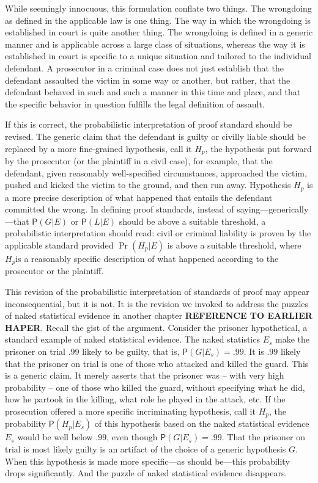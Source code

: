 \documentclass[
  10pt,
  dvipsnames,enabledeprecatedfontcommands]{scrartcl}
\newcommand{\pr}[1]{\mathsf{P}(#1)}
\begin{document}
While seemingly innocuous, this formulation conflate two things. The
wrongdoing as defined in the applicable law is one thing. The way in
which the wrongdoing is established in court is quite another thing. The
wrongdoing is defined in a generic manner and is applicable across a
large class of situations, whereas the way it is established in court is
specific to a unique situation and tailored to the individual defendant.
A prosecutor in a criminal case does not just establish that the
defendant assaulted the victim in some way or another, but rather, that
the defendant behaved in such and such a manner in this time and place,
and that the specific behavior in question fulfills the legal definition
of assault.

If this is correct, the probabilistic interpretation of proof standard
should be revised. The generic claim that the defendant is guilty or
civilly liable should be replaced by a more fine-grained hypothesis,
call it \(H_p\), the hypothesis put forward by the prosecutor (or the
plaintiff in a civil case), for example, that the defendant, given
reasonably well-specified circumstances, approached the victim, pushed
and kicked the victim to the ground, and then run away. Hypothesis
\(H_p\) is a more precise description of what happened that entails the
defendant committed the wrong. In defining proof standards, instead of
saying---generically---that \(\pr{G \vert E}\) or \(\pr{L \vert E}\)
should be above a suitable threshold, a probabilistic interpretation
should read: civil or criminal liability is proven by the applicable
standard provided \(\Pr(H_p \vert E)\) is above a suitable threshold,
where \(H_p\)is a reasonably specific description of what happened
according to the prosecutor or the plaintiff.

This revision of the probabilistic interpretation of standards of proof
may appear inconsequential, but it is not. It is the revision we invoked
to address the puzzles of naked statistical evidence in another chapter
\textbf{REFERENCE TO EARLIER HAPER}. Recall the gist of the argument.
Consider the prisoner hypothetical, a standard example of naked
statistical evidence. The naked statistics \(E_s\) make the prisoner on
trial .99 likely to be guilty, that is, \(\pr{G \vert E_s} =.99\). It is
\(.99\) likely that the prisoner on trial is one of those who attacked
and killed the guard. This is a generic claim. It merely asserts that
the prisoner was -- with very high probability -- one of those who
killed the guard, without specifying what he did, how he partook in the
killing, what role he played in the attack, etc. If the prosecution
offered a more specific incriminating hypothesis, call it \(H_p\), the
probability \(\pr{H_p \vert E_{s}}\) of this hypothesis based on the
naked statistical evidence \(E_s\) would be well below \(.99\), even
though \(\pr{G \vert E_s}=.99\). That the prisoner on trial is most
likely guilty is an artifact of the choice of a generic hypothesis
\(G\). When this hypothesis is made more specific---as should be---this
probability drops significantly. And the puzzle of naked statistical
evidence disappears.
\end{document}
